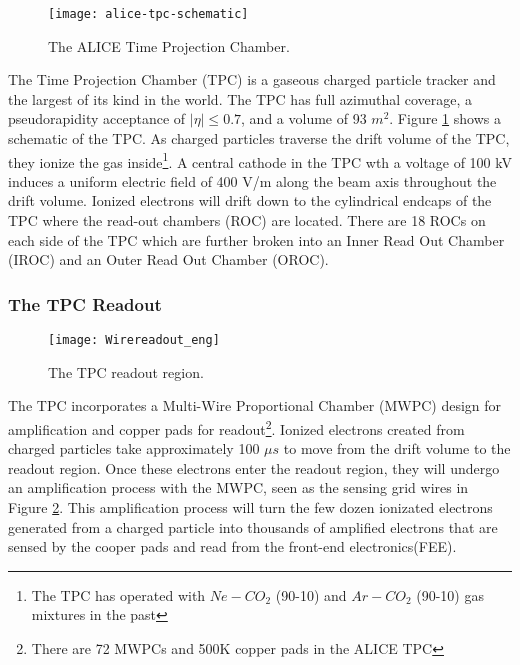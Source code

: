 \begin{figure}[h]
\texttt{[image: alice-tpc-schematic]}
\centering
\caption{The ALICE Time Projection Chamber\cite{2010NIMPA.622..316A}.}
\label{fig:TPC}
\end{figure}

The Time Projection Chamber (TPC)\cite{2010NIMPA.622..316A} is a gaseous charged particle tracker and the largest of its kind in the world.  The TPC has full azimuthal coverage, a pseudorapidity acceptance of $ \left | \eta \right | \leq 0.7$, and a volume of 93 $m^{2}$.  Figure \ref{fig:TPC} shows a schematic of the TPC.  As charged particles traverse the drift volume of the TPC, they ionize the gas inside\footnote{The TPC has operated with $Ne-CO_{2}$ (90-10) and $Ar-CO_{2}$ (90-10) gas mixtures in the past}.  A central cathode in the TPC wth a voltage of 100 kV induces a uniform electric field of 400 V/m along the beam axis throughout the drift volume.  Ionized electrons will drift down to the cylindrical endcaps of the TPC where the read-out chambers (ROC) are located.  There are 18 ROCs on each side of the TPC which are further broken into an Inner Read Out Chamber (IROC) and an Outer Read Out Chamber (OROC).  

\subsubsection{The TPC Readout}\label{sec:tpcread}

\begin{figure}[h]
\texttt{[image: Wirereadout\_eng]}
\centering
\caption{The TPC readout region\cite{diener}.}
\label{fig:TPCreadout}
\end{figure}

The TPC incorporates a Multi-Wire Proportional Chamber (MWPC) design for amplification and copper pads for readout\footnote{There are 72 MWPCs and 500K copper pads in the ALICE TPC}. Ionized electrons created from charged particles take approximately 100 $\mu s$ to move from the drift volume to the readout region.  Once these electrons enter the readout region, they will undergo an amplification process with the MWPC, seen as the sensing grid wires in Figure \ref{fig:TPCreadout}.  This amplification process will turn the few dozen ionizated electrons generated from a charged particle into thousands of amplified electrons that are sensed by the cooper pads and read from the front-end electronics(FEE).  

